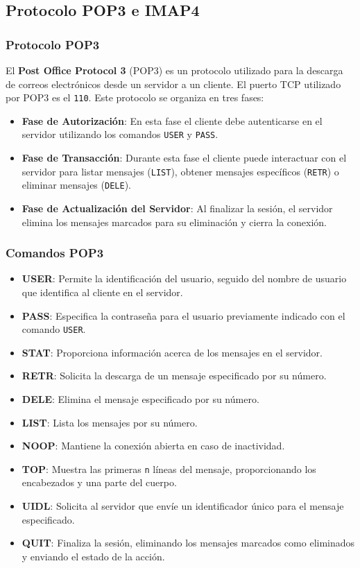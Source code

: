 \documentclass[a4paper,12pt]{article}
\begin{document}
\subsection{Protocolo POP3 e IMAP4}

\subsubsection{Protocolo POP3}

El \textbf{Post Office Protocol 3} (POP3) es un protocolo utilizado para la descarga de correos electrónicos desde un servidor a un cliente. El puerto TCP utilizado por POP3 es el \texttt{110}. Este protocolo se organiza en tres fases: 

\begin{itemize}
    \item \textbf{Fase de Autorización}: En esta fase el cliente debe autenticarse en el servidor utilizando los comandos \texttt{USER} y \texttt{PASS}.
    \item \textbf{Fase de Transacción}: Durante esta fase el cliente puede interactuar con el servidor para listar mensajes (\texttt{LIST}), obtener mensajes específicos (\texttt{RETR}) o eliminar mensajes (\texttt{DELE}).
    \item \textbf{Fase de Actualización del Servidor}: Al finalizar la sesión, el servidor elimina los mensajes marcados para su eliminación y cierra la conexión.
\end{itemize}

\subsubsection{Comandos POP3}

\begin{itemize}
    \item \textbf{USER}: Permite la identificación del usuario, seguido del nombre de usuario que identifica al cliente en el servidor.
    \item \textbf{PASS}: Especifica la contraseña para el usuario previamente indicado con el comando \texttt{USER}.
    \item \textbf{STAT}: Proporciona información acerca de los mensajes en el servidor.
    \item \textbf{RETR}: Solicita la descarga de un mensaje especificado por su número.
    \item \textbf{DELE}: Elimina el mensaje especificado por su número.
    \item \textbf{LIST}: Lista los mensajes por su número.
    \item \textbf{NOOP}: Mantiene la conexión abierta en caso de inactividad.
    \item \textbf{TOP}: Muestra las primeras \texttt{n} líneas del mensaje, proporcionando los encabezados y una parte del cuerpo.
    \item \textbf{UIDL}: Solicita al servidor que envíe un identificador único para el mensaje especificado.
    \item \textbf{QUIT}: Finaliza la sesión, eliminando los mensajes marcados como eliminados y enviando el estado de la acción.
\end{itemize}
\end{document}
